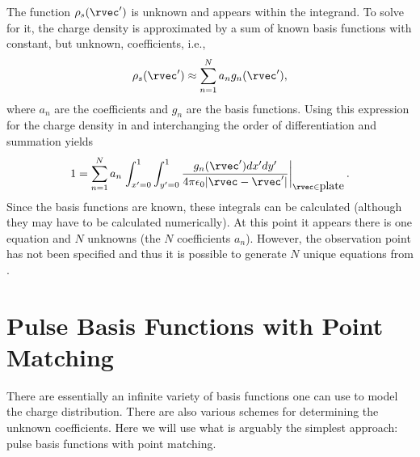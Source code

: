 The function $\rho_s(\rvec')$ is unknown and appears within the
integrand.  To solve for it, the charge density is approximated by a
sum of known basis functions with constant, but unknown, coefficients, i.e., 
\begin{equation}
  \rho_s(\rvec') \approx \sum_{n=1}^N a_n g_n(\rvec'),
\end{equation}
where $a_n$ are the coefficients and $g_n$ are the basis functions.
Using this expression for the charge density in  and
interchanging the order of differentiation and summation yields
\begin{equation}
 1 = 
\sum_{n=1}^N a_n 
  \left.
    \int_{x'=0}^1\int_{y'=0}^1
  \frac{g_n(\rvec')dx' dy'}{4\pi\epsilon_0|\rvec-\rvec'|}
  \right|_{\rvec\in{\mbox{plate}}}.
  \label{eq:vPlateBasis}
\end{equation}
Since the basis functions are known, these integrals can be calculated
(although they may have to be calculated numerically).  At this point
it appears there is one equation and $N$ unknowns (the $N$
coefficients $a_n$).  However, the observation point has not been
specified and thus it is possible to generate $N$ unique equations
from .

\section{Pulse Basis Functions with Point Matching
\label{sec:pulsePoint}}

There are essentially an infinite variety of basis functions one
can use to model the charge distribution.  There are also various
schemes for determining the unknown coefficients.  Here we will use
what is arguably the simplest approach: pulse basis functions with
point matching.

